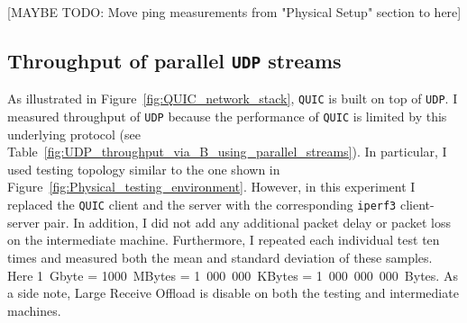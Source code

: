 \documentclass[12pt,a4paper,twoside,openright]{report}
\begin{document}
[MAYBE TODO: Move ping measurements from "Physical Setup" section to here]

\subsection{Throughput of parallel \texttt{UDP} streams}

As illustrated in Figure~\ref{fig:QUIC_network_stack}, \texttt{QUIC} is built on top of \texttt{UDP}.
I measured throughput of \texttt{UDP} because the performance of \texttt{QUIC} is limited by this underlying protocol (see Table~\ref{fig:UDP_throughput_via_B_using_parallel_streams}).
In particular, I used testing topology similar to the one shown in  Figure~\ref{fig:Physical_testing_environment}.
However, in this experiment I replaced the \texttt{QUIC} client and the server with the corresponding \texttt{iperf3} client-server pair.
In addition, I did not add any additional packet delay or packet loss on the intermediate machine.
Furthermore, I repeated each individual test ten times and measured both the mean and standard deviation of these samples.
Here 1~Gbyte = 1000~MBytes = 1~000~000~KBytes = 1~000~000~000~Bytes.
As a side note, Large Receive Offload is disable on both the testing and intermediate machines.
\end{document}
